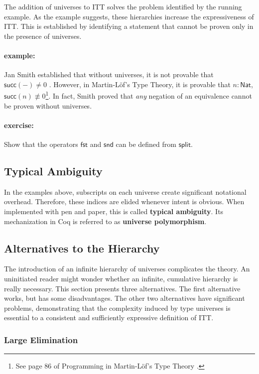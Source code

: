 \documentclass[12pt]{article}
\newcommand{\suc}{\mathsf{succ}}
\begin{document}
The addition of universes to ITT solves the problem identified by the running
example.
As the example suggests, these hierarchies increase the expressiveness of ITT.
This is established by identifying a statement that cannot be proven only in
the presence of universes.

\paragraph{example:} 
Jan Smith established that without universes, it is not provable that
$\suc(-) \not = 0$ \cite{Smith84}.  However, in Martin-L\"{o}f's Type Theory, 
it is provable that $n : \mathsf{Nat}$, $\suc(n) \not \equiv 0$\footnote{See
page 86 of Programming in Martin-L\"{o}f's Type Theory \cite{PMLTT}.}.  
In fact, Smith proved that \emph{any} negation of an equivalence cannot be
proven without universes.

\paragraph{exercise:} Show that the operators $\mathsf{fst}$ and $\mathsf{snd}$ 
can be defined from $\mathsf{split}$.

\subsection{Typical Ambiguity}

In the examples above, subscripts on each universe create significant
notational overhead.  Therefore, these indices are elided whenever intent
is obvious.  When implemented with pen and paper, this is called 
\textbf{typical ambiguity}.  Its mechanization in Coq is referred to as 
\textbf{universe polymorphism}.

\subsection{Alternatives to the Hierarchy}

The introduction of an infinite hierarchy of universes complicates the theory.
An uninitiated reader might wonder whether an infinite, cumulative hierarchy is 
really necessary.
This section presents three alternatives.  
The first alternative works, but has some disadvantages.
The other two alternatives have significant problems, demonstrating that the
complexity induced by type universes is essential to a consistent and
sufficiently expressive definition of ITT.

\subsubsection{Large Elimination}
\end{document}
